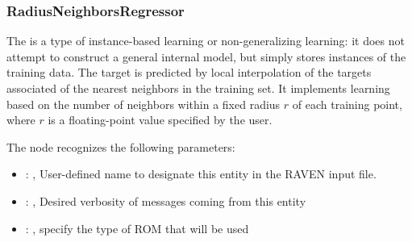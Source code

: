 \subsubsection{RadiusNeighborsRegressor}
  The  is a type of instance-based learning or
  non-generalizing learning: it does not attempt to construct a general internal
  model, but simply stores instances of the training data.                          The target is
  predicted by local interpolation of the targets associated of the                          nearest
  neighbors in the training set.                          It implements learning based on the number
  of neighbors within a fixed radius                          $r$ of each training point, where $r$
  is a floating-point value specified by the                          user.

  The  node recognizes the following parameters:
    \begin{itemize}
      \item {}: ,
        User-defined name to designate this entity in the RAVEN input file.
      \item {}: ,
        Desired verbosity of messages coming from this entity
      \item {}: ,
        specify the type of ROM that will be used
  \end{itemize}

